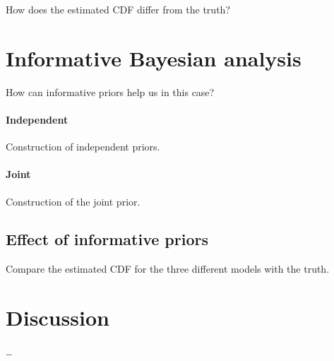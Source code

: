 How does the estimated CDF differ from the truth?

\section{Informative Bayesian analysis}

How can informative priors help us in this case?

\paragraph*{Independent}

Construction of independent priors.

\paragraph*{Joint}

Construction of the joint prior.

\subsection{Effect of informative priors}

Compare the estimated CDF for the three different models with the truth.

\section{Discussion}

\ldots